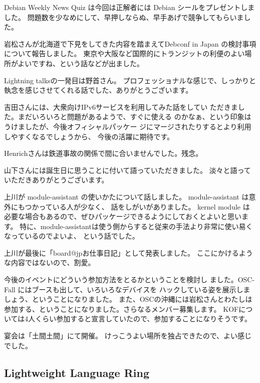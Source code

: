 \documentclass[mingoth,a4paper]{jsarticle}
\begin{document}
	  
	    Debian Weekly News Quiz は今回は正解者には Debian シールをプレゼントしました。
	    問題数を少なめにして、早押しならぬ、早手あげで競争してもらいました。
	  
	  
	    岩松さんが北海道で下見をしてきた内容を踏まえてDebconf in Japan の検討事項について報告しました。
	    東京や大阪など国際的にトランジットの利便のよい場所がよいですね、という話などが出ました。
	  
	  
	    Lightning talksの一発目は野首さん。
	    プロフェッショナルな感じで、しっかりと執念を感じさせてくれる話でした、ありがとうございます。
	  
	  
	    吉田さんには、大衆向けIPv6サービスを利用してみた話をしてい
	    ただきました。まだいろいろと問題があるようで、すぐに使える
	    のかなぁ、という印象はうけましたが、今後オフィシャルパッケー
	    ジにマージされたりするとより利用しやすくなるでしょうから、
	    今後の活躍に期待です。
	  
	  
	    Henrichさんは鉄道事故の関係で間に合いませんでした。残念。
	  
	  
	    山下さんには誕生日に思うことに付いて語っていただきました。
	    淡々と語っていただきありがとうございます。
	  
	  
	    上川が module-assistant の使いかたについて話しました。
	    module-assistant は意外にもつかっている人が少なく、
	    話をしがいがありました。
	    kernel module は必要な場合もあるので、ぜひパッケージできるようにしておくとよいと思います。
	    特に、module-assistantは使う側からすると従来の手法より非常に使い易くなっているのでよいよ、
	    という話でした。
	  
	  
	    上川が最後に「board@jpお仕事日記」として発表しました。
	    ここにかけるような内容ではないので、割愛。	    
	  
	  
	    今後のイベントにどういう参加方法をとるかということを検討し
	    ました。OSC-Fall にはブースも出して、いろいろなデバイスを
	    ハックしている姿を展示しましょう、ということになりました。
	    また、OSCの沖縄には岩松さんとわたしは参加する、ということになりました。さらなるメンバー募集します。
	    KOFについては4人くらい参加すると宣言していたので、参加することになりそうです。
	  
	  
	    宴会は「土間土間」にて開催。
	    けっこうよい場所を独占できたので、よい感じでした。

\subsection{Lightweight Language Ring}
\end{document}
